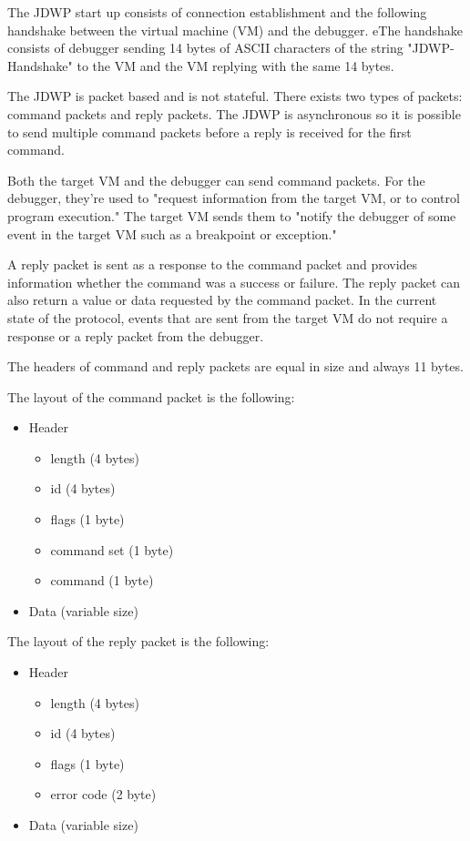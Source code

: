 \documentclass[..thesis.tex]{subfiles}
\begin{document}
The JDWP start up consists of connection establishment and the following handshake between the virtual machine (VM) and the debugger.
eThe handshake consists of debugger sending 14 bytes of ASCII characters of the string "JDWP-Handshake" to the VM and the VM replying with the same 14 bytes.\cite{oracle_jdwp_spec}

The JDWP is packet based and is not stateful. There exists two types of packets: command packets and reply packets.
The JDWP is asynchronous so it is possible to send multiple command packets before a reply is received for the first command.

Both the target VM and the debugger can send command packets. For the debugger, they're used to "request information from the target VM, or to control program execution."
The target VM sends them to "notify the debugger of some event in the target VM such as a breakpoint or exception."\cite{oracle_jdwp_spec}

A reply packet is sent as a response to the command packet and provides information whether the command was a success or failure. The reply packet can also return a value or data requested by the command packet. In the current state of the protocol, events that are sent from the target VM do not require a response or a reply packet from the debugger.\cite{oracle_jdwp_spec}

The headers of command and reply packets are equal in size and always 11 bytes. 

The layout of the command packet is the following:
\begin{itemize}[nosep]
  \item Header
    \begin{itemize}[nosep]
      \item length (4 bytes)
      \item id (4 bytes)
      \item flags (1 byte)
      \item command set (1 byte)
      \item command (1 byte)
    \end{itemize}
  \item Data (variable size) 
\end{itemize}

The layout of the reply packet is the following:
\begin{itemize}[nosep]
  \item Header
    \begin{itemize}[nosep]
      \item length (4 bytes)
      \item id (4 bytes)
      \item flags (1 byte)
      \item error code (2 byte)
    \end{itemize}
  \item Data (variable size) 
\end{itemize}
\end{document}
